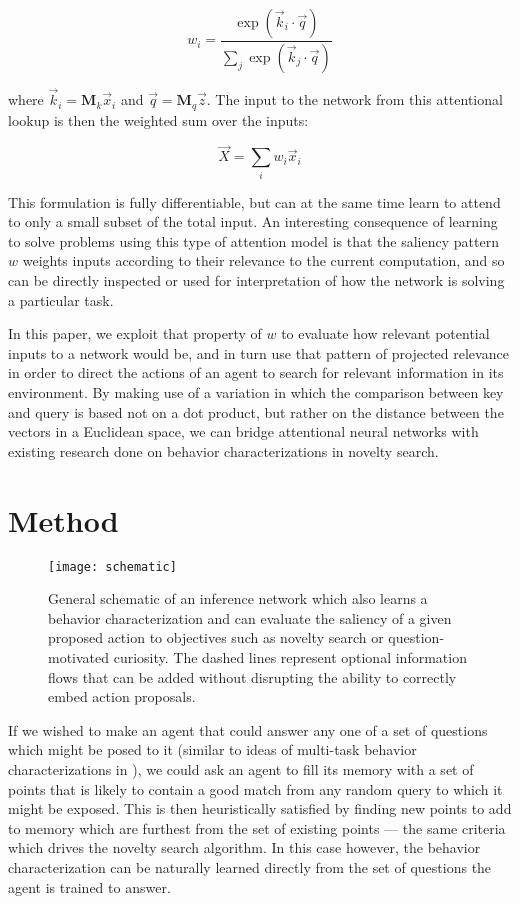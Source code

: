 \documentclass[letterpaper]{article}
\begin{document}
\begin{equation}
w_i = \frac{\exp(\vec{k}_i \cdot \vec{q})}{\sum_j \exp(\vec{k}_j \cdot \vec{q})}
\label{DotProductAttention}
\end{equation}

where $\vec{k}_i = \textbf{M}_k \vec{x}_i$ and $\vec{q} = \textbf{M}_q \vec{z}$. The input to the network from this attentional lookup is then the weighted sum over the inputs:

\begin{equation}
\vec{X} = \sum_i w_i \vec{x}_i
\end{equation}

This formulation is fully differentiable, but can at the same time learn to attend to only a small subset of the total input. An interesting consequence of learning to solve problems using this type of attention model is that the saliency pattern $w$ weights inputs according to their relevance to the current computation, and so can be directly inspected or used for interpretation of how the network is solving a particular task.

In this paper, we exploit that property of $w$ to evaluate how relevant potential inputs to a network would be, and in turn use that pattern of projected relevance in order to direct the actions of an agent to search for relevant information in its environment. By making use of a variation in which the comparison between key and query is based not on a dot product, but rather on the distance between the vectors in a Euclidean space, we can bridge attentional neural networks with existing research done on behavior characterizations in novelty search.

\section{Method}

\begin{figure}
 \texttt{[image: schematic]}
 \caption{\label{Schematic}General schematic of an inference network which also learns a behavior characterization and can evaluate the saliency of a given proposed action to objectives such as novelty search or question-motivated curiosity. The dashed lines represent optional information flows that can be added without disrupting the ability to correctly embed action proposals.}
\end{figure}

If we wished to make an agent that could answer any one of a set of questions which might be posed to it (similar to ideas of multi-task behavior characterizations in  \cite{meyerson2016learning}), we could ask an agent to fill its memory with a set of points that is likely to contain a good match from any random query to which it might be exposed. This is then heuristically satisfied by finding new points to add to memory which are furthest from the set of existing points --- the same criteria which drives the novelty search algorithm. In this case however, the behavior characterization can be naturally learned directly from the set of questions the agent is trained to answer.
\end{document}
